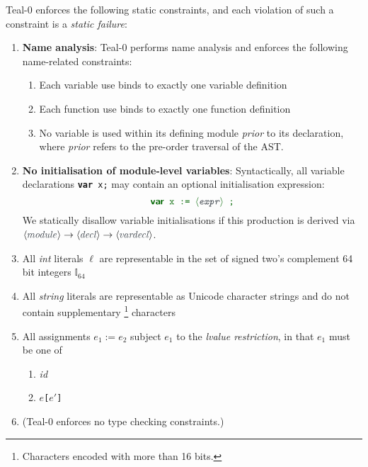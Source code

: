 \documentclass{article}
\newcommand{\ntaX}[1]{\ensuremath{\textcolor{cyan!20!black}{\textit{#1}}}}
\newcommand{\tuple}[1]{\ensuremath{\langle #1 \rangle}}
\newcommand{\terminal}[1]{\textit{#1}}
\newcommand{\vterminal}[1]{\textsf{\textcolor{dgreen}{\texttt{#1}}}}
\newcommand{\nt}[1]{\ensuremath{\tuple{\hspace{-0.02cm}\ntaX{#1}\hspace{0.02cm}}}}
\newcommand{\nta}[1]{\nt{#1}}
\newcommand{\Ckw}[1]{{\textsf{\textbf{#1}}}}
\newcommand{\code}[1]{\texttt{\textcolor{dgreen}{#1}}}
\newcommand{\failure}{\textcolor{dred}{failure}}
\begin{document}
Teal-0 enforces the following static constraints, and each violation of such a constraint is a \emph{static \failure}:
\begin{enumerate}

\item \textbf{Name analysis}: Teal-0 performs name analysis and enforces the following name-related constraints:
  \begin{enumerate}
    \item Each variable use binds to exactly one variable definition
    \item Each function use binds to exactly one function definition
    \item No variable is used within its defining module \emph{prior}
      to its declaration, where \emph{prior} refers to the pre-order
      traversal of the AST.
  \end{enumerate}

\item \textbf{No initialisation of module-level variables}:
  Syntactically, all variable declarations \code{\Ckw{var} x;} may contain an optional initialisation expression:
  \[
  \code{\Ckw{var} x := \nt{expr} ;}
    \]
    We statically disallow variable initialisations if this production
    is derived via
    $\nta{module}\rightarrow\nta{decl}\rightarrow\nta{vardecl}$.
  \item All \terminal{int} literals $\ell$ are representable in the set of signed two's complement 64 bit integers $\mathbb{I}_{64}$
  \item All \terminal{string} literals are representable as Unicode character strings and do not contain supplementary \footnote{Characters encoded with more than 16 bits.} characters
  \item All assignments \vterminal{$e_1 := e_2$} subject $e_1$ to the \emph{lvalue restriction}, in that $e_1$ must be one of
    \begin{enumerate}
      \item \terminal{id}
      \item \vterminal{$e$[$e'$]}
    \end{enumerate}
\item (Teal-0 enforces no type checking constraints.)
\end{enumerate}
\end{document}
